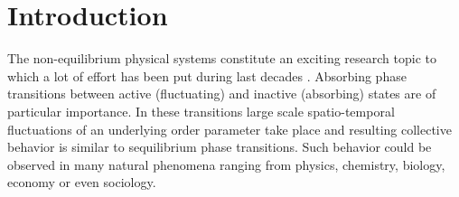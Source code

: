 \documentclass[aps,pre,url,twocolumn,superscriptaddress]{revtex4-1}
\begin{document}
\section{Introduction \label{sec:intro}}

%
%
The non-equilibrium physical systems constitute an exciting research topic
to which a lot of effort has been put during last decades
 \cite{Zia95,HHL08,Tauber2014}. 
Absorbing phase transitions between active (fluctuating) and 
inactive (absorbing) states are of particular importance. In these transitions
large scale spatio-temporal
fluctuations of an underlying order parameter take place and resulting collective
behavior is similar to sequilibrium phase transitions.
Such behavior could be observed in many natural phenomena ranging from physics, chemistry,
biology, economy or even sociology. 
\end{document}
